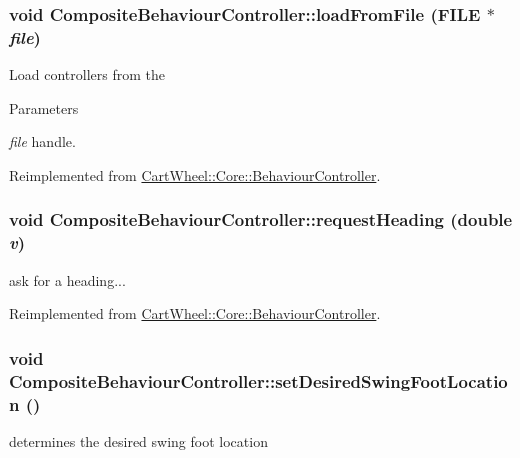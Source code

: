 \hypertarget{classCartWheel_1_1Core_1_1CompositeBehaviourController_ad001c87ff24b2e61b0ee4edb3cca5e3b}{
\subsubsection[{loadFromFile}]{\setlength{\rightskip}{0pt plus 5cm}void CompositeBehaviourController::loadFromFile (FILE $\ast$ {\em file})}}
\label{classCartWheel_1_1Core_1_1CompositeBehaviourController_ad001c87ff24b2e61b0ee4edb3cca5e3b}
Load controllers from the 
\begin{DoxyParams}{Parameters}
\item[{\em file}]handle. \end{DoxyParams}


Reimplemented from \hyperlink{classCartWheel_1_1Core_1_1BehaviourController}{CartWheel::Core::BehaviourController}.

\hypertarget{classCartWheel_1_1Core_1_1CompositeBehaviourController_a48cc3421fce61716da9686c9a351ed78}{
\subsubsection[{requestHeading}]{\setlength{\rightskip}{0pt plus 5cm}void CompositeBehaviourController::requestHeading (double {\em v})}}
\label{classCartWheel_1_1Core_1_1CompositeBehaviourController_a48cc3421fce61716da9686c9a351ed78}
ask for a heading... 

Reimplemented from \hyperlink{classCartWheel_1_1Core_1_1BehaviourController_a9a96dacbf508de76c84fcf494b49c4c9}{CartWheel::Core::BehaviourController}.

\hypertarget{classCartWheel_1_1Core_1_1CompositeBehaviourController_a5b0841672d1b94a3d3dbc51b2a5d0695}{
\subsubsection[{setDesiredSwingFootLocation}]{\setlength{\rightskip}{0pt plus 5cm}void CompositeBehaviourController::setDesiredSwingFootLocation ()}}
\label{classCartWheel_1_1Core_1_1CompositeBehaviourController_a5b0841672d1b94a3d3dbc51b2a5d0695}
determines the desired swing foot location 

